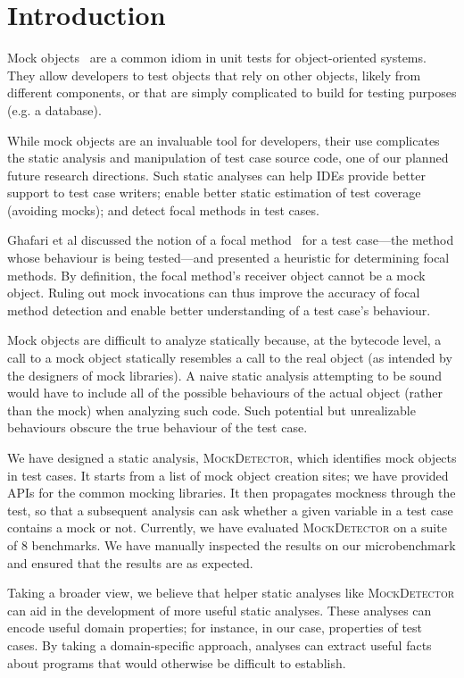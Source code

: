 \section{Introduction}
\label{sec:introduction}

Mock objects~\cite{beck02:_test_driven_devel} are a common idiom in
unit tests for object-oriented systems.  They allow developers to test objects that 
rely on other objects, likely from different components, or that are simply complicated 
to build for testing purposes (e.g. a database).

While mock objects are an invaluable tool for developers, their use
complicates the static analysis and manipulation of test case source code, one of our planned future
research directions. Such static analyses can help IDEs provide better
support to test case writers; enable better static estimation of test coverage
(avoiding mocks); and detect focal methods in test cases.

Ghafari et al discussed the notion of a focal method~\cite{ghafari15:_autom} for a test case---the method
whose behaviour is being tested---and presented a heuristic for determining focal methods.
By definition, the focal method's receiver object cannot be a mock object.
Ruling out mock invocations can thus improve the accuracy of focal method detection and
enable better understanding of a test case's behaviour.

Mock objects are difficult to analyze statically because, at the bytecode level,
a call to a mock object statically resembles a call to the real object (as
intended by the designers of mock libraries).
A naive static analysis attempting to be sound would have to include all of 
the possible behaviours of the actual object (rather than the mock) when analyzing such code. 
Such potential but unrealizable behaviours obscure the true behaviour 
of the test case.

We have designed a static analysis, \textsc{MockDetector}, which identifies
mock objects in test cases. It starts from a list of mock object creation sites; we
have provided APIs for the common mocking libraries. It then propagates mockness
through the test, so that a subsequent analysis
can ask whether a given variable in a test case contains a mock or not. Currently, we have
evaluated \textsc{MockDetector} on a suite of 8 benchmarks. We have manually inspected
the results on our microbenchmark and ensured that the results are as expected.

Taking a broader view, we believe that helper static analyses like \textsc{MockDetector} 
can aid
in the development of more useful static analyses. These analyses can
encode useful domain properties; for instance, in our case, properties
of test cases. By taking a domain-specific approach, analyses can extract
useful facts about programs that would otherwise be difficult to establish.


